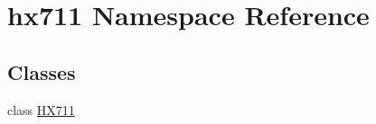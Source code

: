 \hypertarget{namespacehx711}{}\section{hx711 Namespace Reference}
\label{namespacehx711}
\subsection*{Classes}
\begin{DoxyCompactItemize}
\item 
class \hyperlink{classhx711_1_1HX711}{H\+X711}
\end{DoxyCompactItemize}
